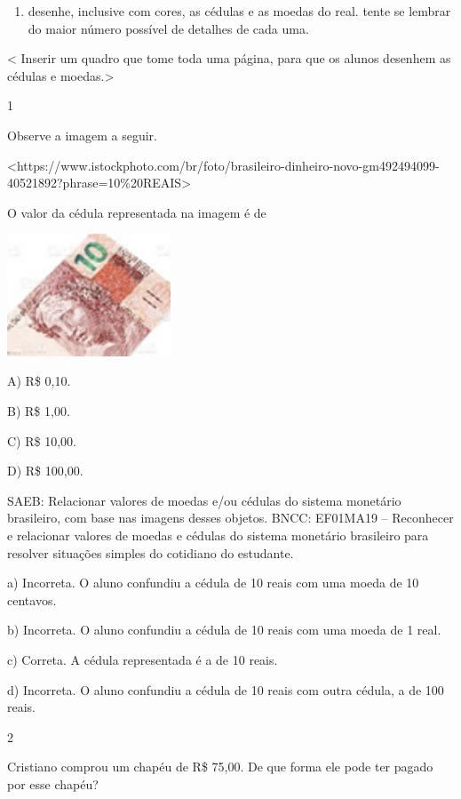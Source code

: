 \begin{enumerate}
\def\labelenumi{\arabic{enumi}.}
\item
  desenhe, inclusive com cores, as cédulas e as moedas do real. tente se lembrar do maior número possível de detalhes de cada uma.
\end{enumerate}

\textless{} Inserir um quadro que tome toda uma página, para que os
alunos desenhem as cédulas e moedas.\textgreater{}



\num{1}

Observe a imagem a seguir.

\textless{}https://www.istockphoto.com/br/foto/brasileiro-dinheiro-novo-gm492494099-40521892?phrase=10\%20REAIS\textgreater{}

O valor da cédula representada na imagem é de

\includegraphics[width=1.92157in,height=1.43284in]{media/image75.png}

A) R\$ 0,10.

B) R\$ 1,00.

C) R\$ 10,00.

D) R\$ 100,00.

SAEB: Relacionar valores de moedas e/ou cédulas do sistema
monetário brasileiro, com base nas imagens desses objetos.
BNCC: EF01MA19 -- Reconhecer e relacionar valores de moedas e cédulas do
sistema monetário brasileiro para resolver situações simples do
cotidiano do estudante.

a) Incorreta. O aluno confundiu a cédula de 10 reais com uma moeda de 10 centavos.

b) Incorreta. O aluno confundiu a cédula de 10 reais com uma moeda de 1 real.

c) Correta. A cédula representada é a de 10 reais.

d) Incorreta. O aluno confundiu a cédula de 10 reais com outra cédula, a de 100 reais.

\num{2}

Cristiano comprou um chapéu de R\$ 75,00. De que forma ele pode ter pagado por esse chapéu?


